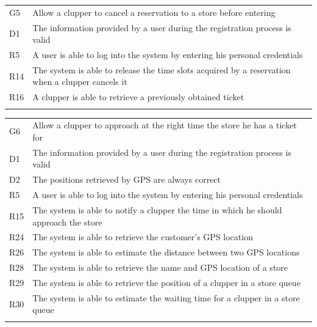 \begin{longtable}[]{@{}
  >{\raggedright\arraybackslash}p{}
  >{\raggedright\arraybackslash}p{}@{}}
\toprule
G5 & Allow a clupper to cancel a reservation to a store before
entering \\ \addlinespace
\midrule
\endhead
D1 & The information provided by a user during the registration process
is valid \\ \addlinespace
R5 & A user is able to log into the system by entering his personal
credentials \\ \addlinespace
R14 & The system is able to release the time slots acquired by a
reservation when a clupper cancels it \\ \addlinespace
R16 & A clupper is able to retrieve a previously obtained
ticket \\ \addlinespace
\bottomrule
\end{longtable}

\begin{longtable}[]{@{}
  >{\raggedright\arraybackslash}p{}
  >{\raggedright\arraybackslash}p{}@{}}
\toprule
G6 & Allow a clupper to approach at the right time the store he has a
ticket for \\ \addlinespace
\midrule
\endhead
D1 & The information provided by a user during the registration process
is valid \\ \addlinespace
D2 & The positions retrieved by GPS are always correct \\ \addlinespace
R5 & A user is able to log into the system by entering his personal
credentials \\ \addlinespace
R15 & The system is able to notify a clupper the time in which he should
approach the store \\ \addlinespace
R24 & The system is able to retrieve the customer's GPS
location \\ \addlinespace
R26 & The system is able to estimate the distance between two GPS
locations \\ \addlinespace
R28 & The system is able to retrieve the name and GPS location of a
store \\ \addlinespace
R29 & The system is able to retrieve the position of a clupper in a
store queue \\ \addlinespace
R30 & The system is able to estimate the waiting time for a clupper in a
store queue \\ \addlinespace
\bottomrule
\end{longtable}

